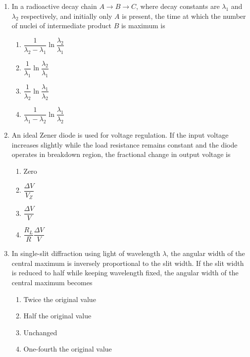 \documentclass[12pt]{article}
\begin{document}
\begin{enumerate}[leftmargin=*]
\begin{enumerate}
\item $\dfrac{mv^3}{c^2}$
\item $\dfrac{mv^2}{c^2}$
\item $\dfrac{mv^4}{c^2}$
\item $\dfrac{mv^3}{c^4}$
\end{enumerate}

\item In a radioactive decay chain $A \to B \to C$, where decay constants are $\lambda_1$ and $\lambda_2$ respectively, and initially only $A$ is present, the time at which the number of nuclei of intermediate product $B$ is maximum is

\begin{enumerate}
\item $\dfrac{1}{\lambda_2-\lambda_1}\ln\dfrac{\lambda_2}{\lambda_1}$
\item $\dfrac{1}{\lambda_1}\ln\dfrac{\lambda_2}{\lambda_1}$
\item $\dfrac{1}{\lambda_2}\ln\dfrac{\lambda_1}{\lambda_2}$
\item $\dfrac{1}{\lambda_1-\lambda_2}\ln\dfrac{\lambda_1}{\lambda_2}$
\end{enumerate}

\item An ideal Zener diode is used for voltage regulation. If the input voltage increases slightly while the load resistance remains constant and the diode operates in breakdown region, the fractional change in output voltage is

\begin{enumerate}
\item Zero
\item $\dfrac{\Delta V}{V_Z}$
\item $\dfrac{\Delta V}{V}$
\item $\dfrac{R_L}{R}\dfrac{\Delta V}{V}$
\end{enumerate}

\item In single-slit diffraction using light of wavelength $\lambda$, the angular width of the central maximum is inversely proportional to the slit width. If the slit width is reduced to half while keeping wavelength fixed, the angular width of the central maximum becomes

\begin{enumerate}
\item Twice the original value
\item Half the original value
\item Unchanged
\item One-fourth the original value
\end{enumerate}


\end{enumerate}
\end{document}
